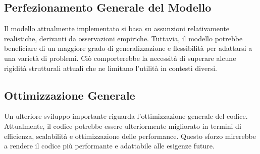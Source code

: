 \subsection{Perfezionamento Generale del Modello}

Il modello attualmente implementato si basa su assunzioni 
relativamente realistiche, derivanti da osservazioni empiriche. 
Tuttavia, il modello potrebbe beneficiare di un maggiore grado 
di generalizzazione e flessibilità per adattarsi a una varietà di 
problemi. Ciò comporterebbe la necessità di superare alcune rigidità 
strutturali attuali che ne limitano l'utilità in contesti diversi.

\subsection{Ottimizzazione Generale}

Un ulteriore sviluppo importante riguarda l'ottimizzazione 
generale del codice. Attualmente, il codice potrebbe essere 
ulteriormente migliorato in termini di efficienza, scalabilità e 
ottimizzazione delle performance. Questo sforzo mirerebbe a rendere 
il codice più performante e adattabile alle esigenze future.